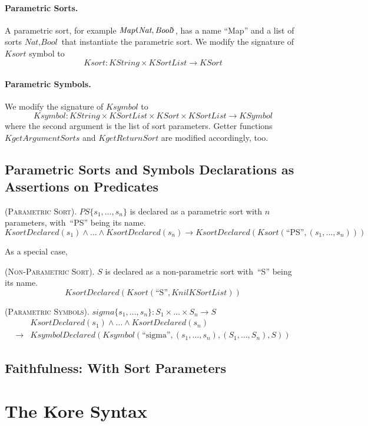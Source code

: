 \documentclass[UTF8,11pt]{article}
\theoremstyle{plain}
\theoremstyle{definition}
\theoremstyle{remark}
\newcommand{\Nat}{\textit{Nat}}
\newcommand{\Bool}{\textit{Bool}}
\newcommand{\Map}{\textit{Map}}
\newcommand{\parametric}[2]{{#1}\raisebox{.2ex}{\texttt{\footnotesize{\{}}}#2\raisebox{.2ex}{\texttt{\footnotesize{\}}}}}
\newcommand{\KString}{\mathit{KString}}
\newcommand{\KSort}{\mathit{KSort}}
\newcommand{\Ksort}{\mathit{Ksort}}
\newcommand{\KSymbol}{\mathit{KSymbol}}
\newcommand{\Ksymbol}{\mathit{Ksymbol}}
\newcommand{\KgetArgumentSorts}{\mathit{KgetArgumentSorts}}
\newcommand{\KgetReturnSort}{\mathit{KgetReturnSort}}
\newcommand{\KSortList}{\mathit{KSortList}}
\newcommand{\KnilKSortList}{\mathit{KnilKSortList}}
\newcommand{\KsortDeclared}{\mathit{KsortDeclared}}
\newcommand{\KsymbolDeclared}{\mathit{KsymbolDeclared}}
\begin{document}
\paragraph{Parametric Sorts.} A parametric sort, for example
$\parametric{\Map}{\Nat,\Bool}$, has a name ``Map'' and a list of sorts 
$\Nat, \Bool$ that instantiate the parametric sort.
We modify the signature of $\Ksort$ symbol to
$$
\Ksort \colon \KString \times \KSortList \to \KSort
$$

\paragraph{Parametric Symbols.} We modify the signature of $\Ksymbol$ to 
$$
\Ksymbol \colon \KString \times \KSortList \times \KSort \times \KSortList \to 
\KSymbol
$$
where the second argument is the list of sort parameters.
Getter functions $\KgetArgumentSorts$ and $\KgetReturnSort$ are modified 
accordingly, too.

\subsection{Parametric Sorts and Symbols Declarations as Assertions on 
Predicates}\quad

(\textsc{Parametric Sort}).
$\mathit{PS\{s_1,\dots,s_n\}}$ is declared as a parametric sort with $n$ 
parameters, with~``PS'' being its name.
$$
\KsortDeclared(s_1) \wedge \dots \wedge \KsortDeclared(s_n) \to 
\KsortDeclared(\Ksort(\text{``PS''}, (s_1,\dots,s_n)))
$$

As a special case,

(\textsc{Non-Parametric Sort}).
$\mathit{S}$ is declared as a non-parametric sort with~``S'' being its name.
$$
\KsortDeclared(\Ksort(\text{``S''}, \KnilKSortList))
$$

(\textsc{Parametric Symbols}).
$\mathit{sigma}\{s_1,\dots, s_n\} \colon S_1 \times \dots \times S_n \to S$
\begin{align*}
&\KsortDeclared(s_1) \wedge \dots \wedge \KsortDeclared(s_n) \\
\to 
&\KsymbolDeclared(\Ksymbol(\text{``sigma''}, (s_1,\dots,s_n), (S_1,\dots,S_n), 
S))
\end{align*}

\subsection{Faithfulness: With Sort Parameters}

\section{The Kore Syntax}
\end{document}
